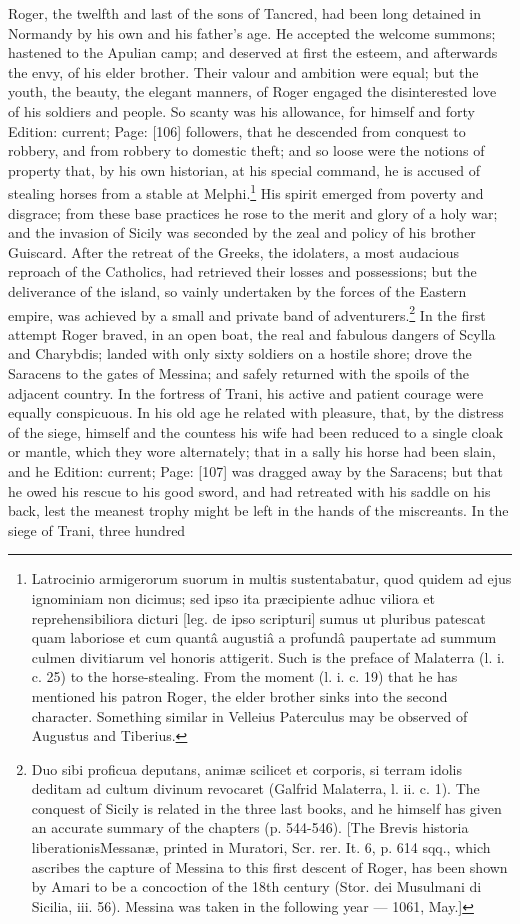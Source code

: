 Roger, the twelfth and last of the sons of Tancred, had been long detained in Normandy by his own and his father\texthebrew{}’s age. He accepted the welcome summons; hastened to the Apulian camp; and deserved at first the esteem, and afterwards the envy, of his elder brother. Their valour and ambition were equal; but the youth, the beauty, the elegant manners, of Roger engaged the disinterested love of his soldiers and people. So scanty was his allowance, for himself and forty Edition: current; Page: [106] followers, that he descended from conquest to robbery, and from robbery to domestic theft; and so loose were the notions of property that, by his own historian, at his special command, he is accused of stealing horses from a stable at Melphi.\footnote{Latrocinio armigerorum suorum in multis sustentabatur, quod quidem ad ejus ignominiam non dicimus; sed ipso ita præcipiente adhuc viliora et reprehensibiliora dicturi [leg. de ipso scripturi] sumus ut pluribus patescat quam laboriose et cum quantâ augustiâ a profundâ paupertate ad summum culmen divitiarum vel honoris attigerit. Such is the preface of Malaterra (l. i. c. 25) to the horse-stealing. From the moment (l. i. c. 19) that he has mentioned his patron Roger, the elder brother sinks into the second character. Something similar in Velleius Paterculus may be observed of Augustus and Tiberius.} His spirit emerged from poverty and disgrace; from these base practices he rose to the merit and glory of a holy war; and the invasion of Sicily was seconded by the zeal and policy of his brother Guiscard. After the retreat of the Greeks, the idolaters, a most audacious reproach of the Catholics, had retrieved their losses and possessions; but the deliverance of the island, so vainly undertaken by the forces of the Eastern empire, was achieved by a small and private band of adventurers.\footnote{Duo sibi proficua deputans, animæ scilicet et corporis, si terram idolis deditam ad cultum divinum revocaret (Galfrid Malaterra, l. ii. c. 1). The conquest of Sicily is related in the three last books, and he himself has given an accurate summary of the chapters (p. 544-546). [The Brevis historia liberationisMessanæ, printed in Muratori, Scr. rer. It. 6, p. 614 sqq., which ascribes the capture of Messina to this first descent of Roger, has been shown by Amari to be a concoction of the 18th century (Stor. dei Musulmani di Sicilia, iii. 56). Messina was taken in the following year \texthebrew{—} 1061, May.]} In the first attempt Roger braved, in an open boat, the real and fabulous dangers of Scylla and Charybdis; landed with only sixty soldiers on a hostile shore; drove the Saracens to the gates of Messina; and safely returned with the spoils of the adjacent country. In the fortress of Trani, his active and patient courage were equally conspicuous. In his old age he related with pleasure, that, by the distress of the siege, himself and the countess his wife had been reduced to a single cloak or mantle, which they wore alternately; that in a sally his horse had been slain, and he Edition: current; Page: [107] was dragged away by the Saracens; but that he owed his rescue to his good sword, and had retreated with his saddle on his back, lest the meanest trophy might be left in the hands of the miscreants. In the siege of Trani, three hundred 